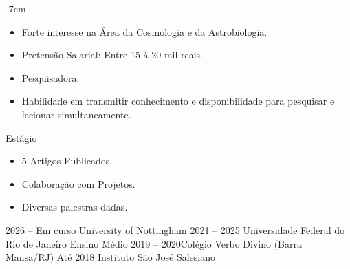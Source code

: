 \documentclass[10pt,a4paper]{altacv}
\begin{document}



\begin{adjustwidth}{}{-7cm}
\makecvheader
\end{adjustwidth}


\begin{itemize}
\item Forte interesse na Área da Cosmologia e da Astrobiologia.
\item Pretensão Salarial: Entre 15 à 20 mil reais.
\item Pesquisadora.
\item Habilidade em transmitir conhecimento e disponibilidade para pesquisar e lecionar simultaneamente.
\end{itemize}
\bigskip


{Estágio}


\begin{itemize}
\item  5 Artigos Publicados. \\     \item Colaboração com Projetos.\\
\item Diversas palestras dadas.\\
\end{itemize}
\bigskip



{2026 -- Em curso} {University of Nottingham}
{2021 -- 2025} {Universidade Federal do Rio de Janeiro}
\cvevent{} {Ensino Médio}
{2019 -- 2020}{Colégio Verbo Divino (Barra Mansa/RJ)}
{ Até 2018 }{Instituto São José Salesiano }
\end{document}

